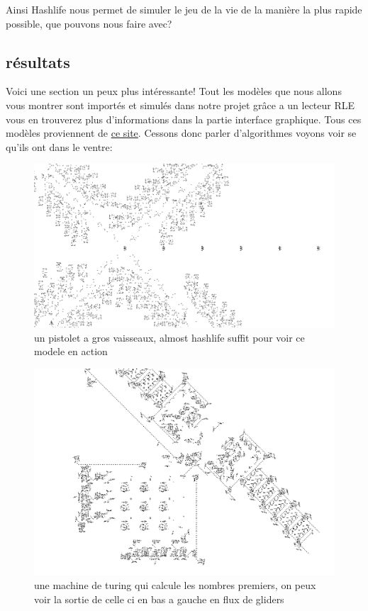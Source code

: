 Ainsi Hashlife nous permet de simuler le jeu de la vie de la manière la plus rapide possible, que pouvons nous faire avec?

\subsection{résultats}
Voici une section un peux plus intéressante! Tout les modèles que nous allons vous montrer sont importés et simulés dans notre projet grâce a un lecteur RLE vous en trouverez plus d'informations dans la partie interface graphique. Tous ces modèles proviennent de \href{https://conwaylife.com/wiki/}{ce site}. Cessons donc parler d'algorithmes voyons voir se qu'ils ont dans le ventre:
\begin{figure}[H]
        \center
        \includegraphics[scale=0.3]{images/imgHashlife/biggun.png}
        \caption{un pistolet a gros vaisseaux, almost hashlife suffit pour voir ce modele en action}
\end{figure}


\begin{figure}[H]
        \center
        \includegraphics[scale=0.3]{images/imgHashlife/turingmachine.png}
        \caption{une machine de turing qui calcule les nombres premiers,
        on peux voir la sortie de celle ci en bas a gauche en flux de gliders}
\end{figure}

